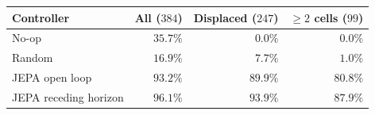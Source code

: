 \begin{tabular}{lrrr}
\toprule
\rowcolor{Navy!8}
Controller & All ($384$) & Displaced ($247$) & $\ge2$ cells ($99$) \\
\midrule
No-op & $35.7\%$ & $0.0\%$ & $0.0\%$ \\
Random & $16.9\%$ & $7.7\%$ & $1.0\%$ \\
\midrule
\rowcolor{JEPA!7}
JEPA open loop & $93.2\%$ & $89.9\%$ & $80.8\%$ \\
JEPA receding horizon & $96.1\%$ & $93.9\%$ & $87.9\%$ \\
\bottomrule
\end{tabular}
